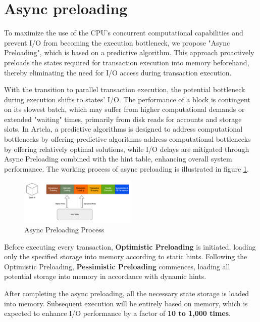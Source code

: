 
\section{Async preloading}

To maximize the use of the CPU's concurrent computational capabilities and prevent I/O from becoming the execution bottleneck, we propose "Async Preloading", which is based on a predictive algorithm. This approach proactively preloads the states required for transaction execution into memory beforehand, thereby eliminating the need for I/O access during transaction execution.

With the transition to parallel transaction execution, the potential bottleneck during execution shifts to states' I/O. The performance of a block is contingent on its slowest batch, which may suffer from higher computational demands or extended "waiting" times, primarily from disk reads for accounts and storage slots. In Artela, a predictive algorithms is designed to address computational bottlenecks by offering predictive algorithms address computational bottlenecks by offering relatively optimal solutions, while I/O delays are mitigated through Async Preloading combined with the hint table, enhancing overall system performance. The working process of async preloading is illustrated in figure \ref{fig:async_preloading}.

\begin{figure}[htp]
  \centering
  \includegraphics[width=0.5\textwidth]{sections/images/async-preloading.png}
  \caption{Async Preloading Process}
  \label{fig:async_preloading}
\end{figure}

Before executing every transaction, \textbf{Optimistic Preloading} is initiated, loading only the specified storage into memory according to static hints. Following the Optimistic Preloading, \textbf{Pessimistic Preloading} commences, loading all potential storage into memory in accordance with dynamic hints.

After completing the async preloading, all the necessary state storage is loaded into memory. Subsequent execution will be entirely based on memory, which is expected to enhance I/O performance by a factor of \textbf{10 to 1,000 times}.

